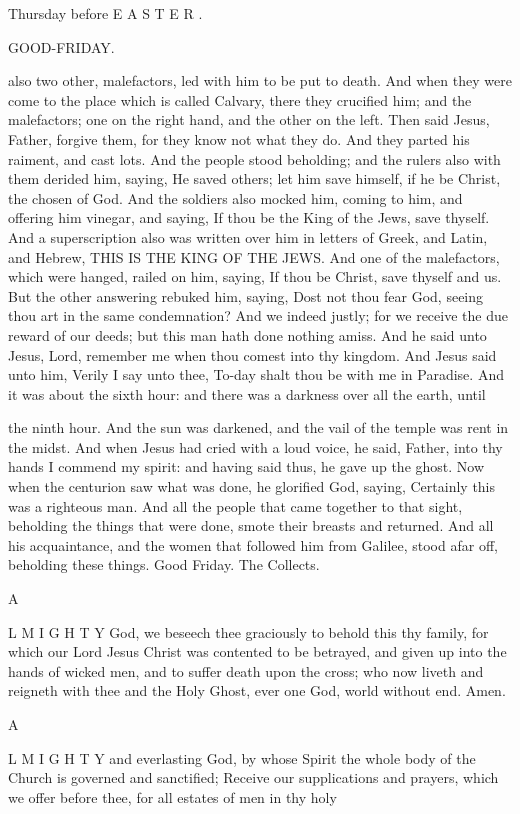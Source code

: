 Thursday before E A S T E R .

GOOD-FRIDAY.

also two other, malefactors, led with him to be put to death. And when they were come to the place which is called Calvary, there they crucified him; and the malefactors; one on the right hand, and the other on the left. Then said Jesus, Father, forgive them, for they know not what they do. And they parted his raiment, and cast lots. And the people stood beholding; and the rulers also with them derided him, saying, He saved others; let him save himself, if he be Christ, the chosen of God. And the soldiers also mocked him, coming to him, and offering him vinegar, and saying, If thou be the King of the Jews, save thyself. And a superscription also was written over him in letters of Greek, and Latin, and Hebrew, THIS IS THE KING OF THE JEWS. And one of the malefactors, which were hanged, railed on him, saying, If thou be Christ, save thyself and us. But the other answering rebuked him, saying, Dost not thou fear God, seeing thou art in the same condemnation? And we indeed justly; for we receive the due reward of our deeds; but this man hath done nothing amiss. And he said unto Jesus, Lord, remember me when thou comest into thy kingdom. And Jesus said unto him, Verily I say unto thee, To-day shalt thou be with me in Paradise. And it was about the sixth hour: and there was a darkness over all the earth, until

the ninth hour. And the sun was darkened, and the vail of the temple was rent in the midst. And when Jesus had cried with a loud voice, he said, Father, into thy hands I commend my spirit: and having said thus, he gave up the ghost. Now when the centurion saw what was done, he glorified God, saying, Certainly this was a righteous man. And all the people that came together to that sight, beholding the things that were done, smote their breasts and returned. And all his acquaintance, and the women that followed him from Galilee, stood afar off, beholding these things. Good Friday. The Collects.

A

L M I G H T Y God, we beseech thee graciously to behold this thy family, for which our Lord Jesus Christ was contented to be betrayed, and given up into the hands of wicked men, and to suffer death upon the cross; who now liveth and reigneth with thee and the Holy Ghost, ever one God, world without end. Amen.

A

L M I G H T Y and everlasting God, by whose Spirit the whole body of the Church is governed and sanctified; Receive our supplications and prayers, which we offer before thee, for all estates of men in thy holy

